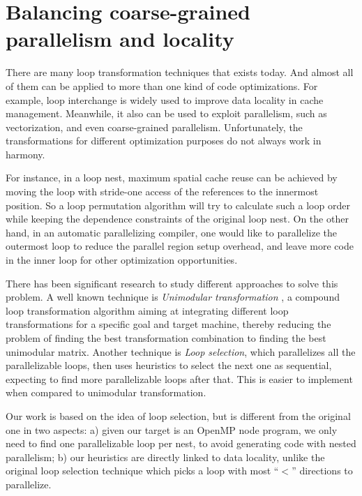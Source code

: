 
\section{Balancing coarse-grained parallelism and locality}
\label{selection}

There are many loop transformation techniques that exists today\cite{All02}. And almost all of them can be applied to more than
one kind of code optimizations. For example, loop interchange is
widely used to improve data locality in cache management. Meanwhile, it
also can be used to exploit parallelism, such as vectorization, and
even coarse-grained parallelism.  Unfortunately, the transformations
for different optimization purposes do not always work in harmony.

For instance, in a loop nest, maximum spatial cache reuse can be achieved by moving the loop with stride-one access of the references to the innermost position. So a loop permutation
algorithm will try to calculate such a loop order while keeping the
dependence constraints of the original loop nest. On the other hand, in an automatic parallelizing compiler, one would
like to parallelize the outermost loop to reduce the parallel region
setup overhead, and leave more code in the inner loop for other
optimization opportunities. 

There has been significant research to study different approaches to solve this problem.
A well known technique is \emph{Unimodular transformation}
\cite{Mic91,Lam91,Ban90}, a compound loop transformation algorithm aiming at
integrating different loop transformations for a specific goal and
target machine, thereby reducing the problem of finding the best
transformation combination to finding the best unimodular matrix. Another technique is \emph{Loop selection}\cite{All02}, which
parallelizes all the parallelizable loops, then uses heuristics to
select the next one as sequential, expecting to find more
parallelizable loops after that. This is easier to implement when compared to
unimodular transformation.

Our work is based on the idea of loop selection, but is different from
the original one in two aspects: a) given our target is an OpenMP node
program, we only need to find one parallelizable loop per nest, to avoid
generating code with nested parallelism; b) our heuristics are
directly linked to data locality, unlike the original loop selection
technique which picks a loop with most ``$<$'' directions to parallelize.

